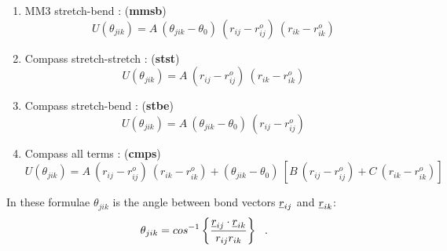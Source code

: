 \begin{enumerate}
\item MM3 stretch-bend \cite{allinger-89a}:  ({\bf mmsb})
\begin{equation}
U(\theta_{jik}) = A~(\theta_{jik}-\theta_{0})~(r_{ij} - r_{ij}^{o})~(r_{ik} - r_{ik}^{o})
\end{equation}
\item Compass stretch-stretch \cite{sun-98}:  ({\bf stst})
\begin{equation}
U(\theta_{jik}) = A~(r_{ij} - r_{ij}^{o})~(r_{ik} - r_{ik}^{o})
\end{equation}
\item Compass stretch-bend \cite{sun-98}:  ({\bf stbe})
\begin{equation}
U(\theta_{jik}) = A~(\theta_{jik}-\theta_{0})~(r_{ij} - r_{ij}^{o})
\end{equation}
\item Compass all terms \cite{sun-98}:  ({\bf cmps})
\begin{equation}
U(\theta_{jik}) = A~(r_{ij} - r_{ij}^{o})~(r_{ik} - r_{ik}^{o}) +
(\theta_{jik}-\theta_{0})~[B~(r_{ij} - r_{ij}^{o})+C~(r_{ik} - r_{ik}^{o})]
\end{equation}
\end{enumerate}
In these formulae $\theta_{jik}$ is the angle between bond vectors
$\mbox{$\underline{r}$}_{ij}$ and $\mbox{$\underline{r}$}_{ik}$:
\begin{equation}
\theta_{jik}=cos^{-1}\left\{\frac{\mbox{$\underline{r}$}_{ij}\cdot\mbox{$\underline{r}$}_{ik}}
{r_{ij}r_{ik}}\right\}~~.
\end{equation}


